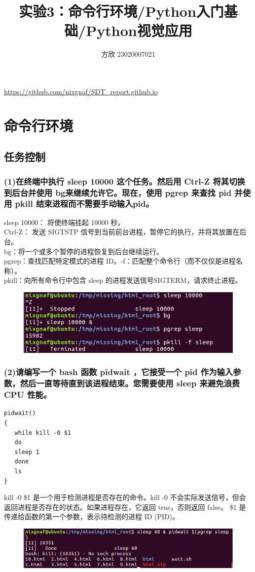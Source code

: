 \documentclass{article}
\title{实验3：命令行环境/Python入门基础/Python视觉应用}
\author{方欣 23020007021}
\date{}
\begin{document}
\maketitle

\url{https://github.com/nixgnaf/SDT_report.github.io}

\section{命令行环境}

\subsection{任务控制}
\subsubsection{(1)在终端中执行 sleep 10000 这个任务。然后用 Ctrl-Z 将其切换到后台并使用 bg来继续允许它。现在，使用 pgrep 来查找 pid 并使用 pkill 结束进程而不需要手动输入pid。}

\noindent sleep 10000： 将使终端挂起 10000 秒。\\
Ctrl-Z： 发送 SIGTSTP 信号到当前前台进程，暂停它的执行，并将其放置在后台。\\
bg：将一个或多个暂停的进程恢复到后台继续运行。\\
pgrep：查找匹配特定模式的进程 ID。-f：匹配整个命令行（而不仅仅是进程名称）。\\
pkill：向所有命令行中包含 sleep 的进程发送信号SIGTERM，请求终止进程。
\begin{figure}[h]
    \centering
    \includegraphics[width=0.5\linewidth]{image1.png}
\end{figure}

\subsubsection{(2)请编写一个 bash 函数 pidwait ，它接受一个 pid 作为输入参数，然后一直等待直到该进程结束。您需要使用 sleep 来避免浪费 CPU 性能。}
\begin{lstlisting}[style=myStyle]
pidwait()
{
   while kill -0 $1 
   do
   sleep 1 
   done
   ls
}
\end{lstlisting}
kill -0 \$1 是一个用于检测进程是否存在的命令。kill -0 不会实际发送信号，但会返回进程是否存在的状态。如果进程存在，它返回 true，否则返回 false。
\$1 是传递给函数的第一个参数，表示待检测的进程 ID (PID)。
\begin{figure}[h]
    \centering
    \includegraphics[width=0.75\linewidth]{image2.png}
\end{figure}
\end{document}
